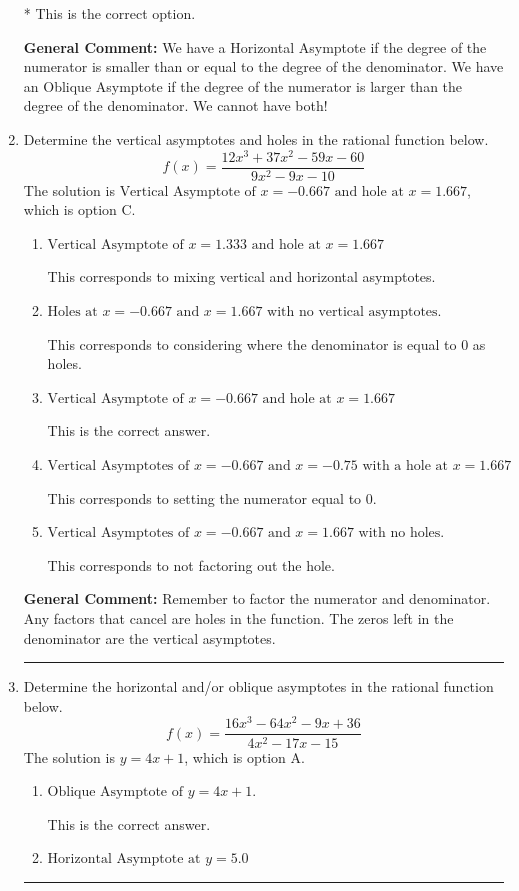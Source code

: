 \documentclass{extbook}[14pt]
\newcommand{\litem}[1]{\item #1

\rule{\textwidth}{0.4pt}}
\begin{document}
\begin{enumerate}
{\begin{enumerate}[label=\Alph*.]
* This is the correct option.
\end{enumerate}

\textbf{General Comment:} We have a Horizontal Asymptote if the degree of the numerator is smaller than or equal to the degree of the denominator. We have an Oblique Asymptote if the degree of the numerator is larger than the degree of the denominator. We cannot have both!
}
\litem{
Determine the vertical asymptotes and holes in the rational function below.
\[ f(x) = \frac{12x^{3} +37 x^{2} -59 x -60}{9x^{2} -9 x -10} \]The solution is \( \text{Vertical Asymptote of } x = -0.667 \text{ and hole at } x = 1.667 \), which is option C.\begin{enumerate}[label=\Alph*.]
\item \( \text{Vertical Asymptote of } x = 1.333 \text{ and hole at } x = 1.667 \)

This corresponds to mixing vertical and horizontal asymptotes.
\item \( \text{Holes at } x = -0.667 \text{ and } x = 1.667 \text{ with no vertical asymptotes.} \)

This corresponds to considering where the denominator is equal to 0 as holes.
\item \( \text{Vertical Asymptote of } x = -0.667 \text{ and hole at } x = 1.667 \)

This is the correct answer.
\item \( \text{Vertical Asymptotes of } x = -0.667 \text{ and } x = -0.75 \text{ with a hole at } x = 1.667 \)

This corresponds to setting the numerator equal to 0.
\item \( \text{Vertical Asymptotes of } x = -0.667 \text{ and } x = 1.667 \text{ with no holes.} \)

This corresponds to not factoring out the hole.
\end{enumerate}

\textbf{General Comment:} Remember to factor the numerator and denominator. Any factors that cancel are holes in the function. The zeros left in the denominator are the vertical asymptotes.
}
\litem{
Determine the horizontal and/or oblique asymptotes in the rational function below.
\[ f(x) = \frac{16x^{3} -64 x^{2} -9 x + 36}{4x^{2} -17 x -15} \]The solution is \( y = 4x + 1 \), which is option A.\begin{enumerate}[label=\Alph*.]
\item \( \text{Oblique Asymptote of } y = 4x + 1. \)

This is the correct answer.
\item \( \text{Horizontal Asymptote at } y = 5.0 \)


\end{enumerate}}
\end{enumerate}
\end{document}
